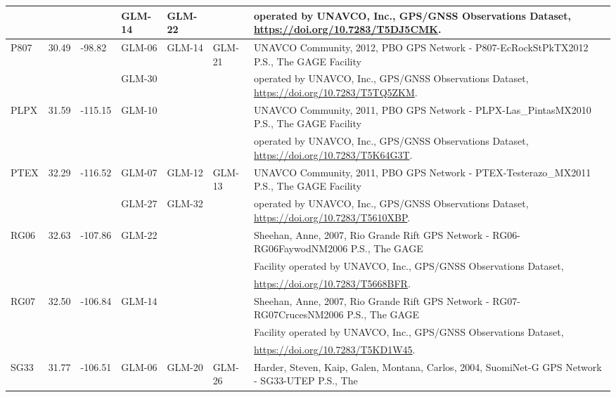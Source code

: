 \begin{landscape}
\begin{longtable}{llllllp{12cm}}
    &&& GLM-14 & GLM-22 & & operated by UNAVCO, Inc., GPS/GNSS Observations Dataset, \url{https://doi.org/10.7283/T5DJ5CMK}.\\\hline
    \multirow{2}{*}{P807} & \multirow{2}{*}{30.49} & \multirow{2}{*}{-98.82} & GLM-06 & GLM-14 & GLM-21 & UNAVCO Community, 2012, PBO GPS Network - P807-EcRockStPkTX2012 P.S., The GAGE Facility \\
    &&& GLM-30 &&& operated by UNAVCO, Inc., GPS/GNSS Observations Dataset, \url{https://doi.org/10.7283/T5TQ5ZKM}.\\\hline
    \multirow{2}{*}{PLPX} & \multirow{2}{*}{31.59} & \multirow{2}{*}{-115.15} & \multirow{2}{*}{GLM-10} & & & UNAVCO Community, 2011, PBO GPS Network - PLPX-Las\_PintasMX2010 P.S., The GAGE Facility \\
    &&&&&& operated by UNAVCO, Inc., GPS/GNSS Observations Dataset, \url{https://doi.org/10.7283/T5K64G3T}.\\\hline
    \multirow{2}{*}{PTEX} & \multirow{2}{*}{32.29} & \multirow{2}{*}{-116.52} & GLM-07 & GLM-12 & GLM-13  & UNAVCO Community, 2011, PBO GPS Network - PTEX-Testerazo\_MX2011 P.S., The GAGE Facility \\
    &&& GLM-27 & GLM-32 & & operated by UNAVCO, Inc., GPS/GNSS Observations Dataset, \url{https://doi.org/10.7283/T5610XBP}.\\\hline 
    \multirow{3}{*}{RG06} & \multirow{3}{*}{32.63} & \multirow{3}{*}{-107.86} & \multirow{3}{*}{GLM-22} & & & Sheehan, Anne, 2007, Rio Grande Rift GPS Network - RG06-RG06FaywodNM2006 P.S., The GAGE \\
    &&&&&& Facility operated by UNAVCO, Inc., GPS/GNSS Observations Dataset, \\
    &&&&&& \url{https://doi.org/10.7283/T5668BFR}.\\\hline
    \multirow{3}{*}{RG07} & \multirow{3}{*}{32.50} & \multirow{3}{*}{-106.84} & \multirow{3}{*}{GLM-14} & & & Sheehan, Anne, 2007, Rio Grande Rift GPS Network - RG07-RG07CrucesNM2006 P.S., The GAGE  \\
    &&&&&& Facility operated by UNAVCO, Inc., GPS/GNSS Observations Dataset, \\
    &&&&&& \url{https://doi.org/10.7283/T5KD1W45}. \\\hline
    \multirow{3}{*}{SG33} & \multirow{3}{*}{31.77} & \multirow{3}{*}{-106.51} & \multirow{3}{*}{GLM-06} & \multirow{3}{*}{GLM-20} & \multirow{3}{*}{GLM-26} & Harder, Steven, Kaip, Galen, Montana, Carlos, 2004, SuomiNet-G GPS Network - SG33-UTEP P.S., The \\

\end{longtable}
\end{landscape}

